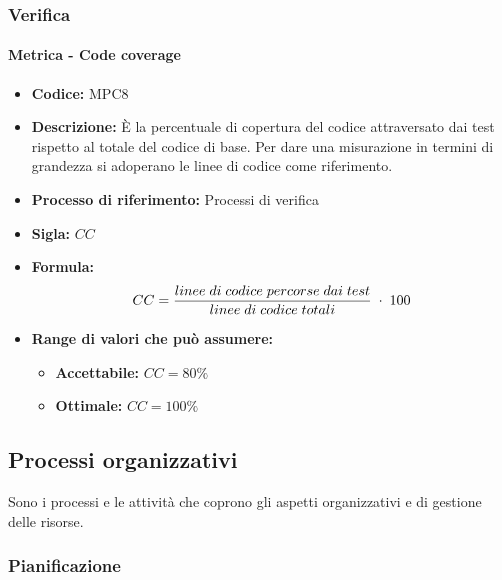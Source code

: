 \subsubsection{Verifica}
    \paragraph{Metrica - Code coverage}
    \begin{itemize}
        \item \textbf{Codice:} MPC8
        \item \textbf{Descrizione:} È la percentuale di copertura del codice attraversato dai test rispetto al totale del codice di base. Per dare una misurazione in termini di grandezza si adoperano le linee di codice come riferimento.
        \item \textbf{Processo di riferimento:} Processi di verifica
        \item \textbf{Sigla:} $CC$
        \item \textbf{Formula:} $$CC = {linee \; di \; codice \; percorse \; dai  \; test \over linee \; di \; codice \; totali} \; \cdot \; 100$$
        \item \textbf{Range di valori che può assumere:}
        \begin{itemize}
            \item \textbf{Accettabile:} $CC = 80\%$
            \item \textbf{Ottimale:} $CC = 100\%$
        \end{itemize}
    \end{itemize}

\subsection{Processi organizzativi}
Sono i processi e le attività che coprono gli aspetti organizzativi e di gestione delle risorse.

\subsubsection{Pianificazione}
